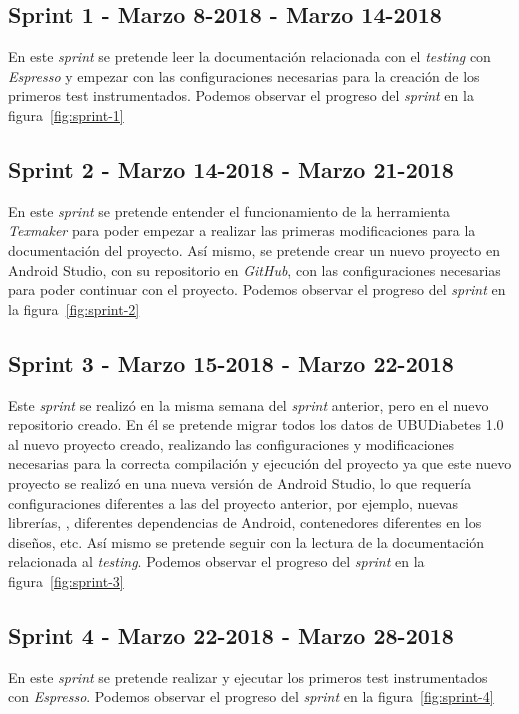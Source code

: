 \subsection{Sprint 1 - Marzo 8-2018 - Marzo 14-2018}
En este \textit{sprint} se pretende leer la documentación relacionada con el \textit{testing} con \textit{Espresso} y empezar con las configuraciones necesarias para la creación de los primeros test instrumentados.
Podemos observar el progreso del \textit{sprint} en la figura~\ref{fig:sprint-1}
\subsection{Sprint 2 - Marzo 14-2018 - Marzo 21-2018}
En este \textit{sprint} se pretende entender el funcionamiento de la herramienta \textit{Texmaker} para poder empezar a realizar las primeras modificaciones para la documentación del proyecto.
Así mismo, se pretende crear un nuevo proyecto en Android Studio, con su repositorio en \textit{GitHub}, con las configuraciones necesarias para poder continuar con el proyecto.
Podemos observar el progreso del \textit{sprint} en la figura~\ref{fig:sprint-2}
\subsection{Sprint 3 - Marzo 15-2018 - Marzo 22-2018}
Este \textit{sprint} se realizó en la misma semana del \textit{sprint} anterior, pero en el nuevo repositorio creado. En él se pretende migrar todos los datos de UBUDiabetes 1.0 al nuevo proyecto creado, realizando las configuraciones y modificaciones necesarias para la correcta compilación y ejecución del proyecto ya que este nuevo proyecto se realizó en una nueva versión de Android Studio, lo que requería configuraciones diferentes a las del proyecto anterior, por ejemplo, nuevas librerías, , diferentes dependencias de Android, contenedores diferentes en los diseños, etc. Así mismo se pretende seguir con la lectura de la documentación relacionada al \textit{testing}.
Podemos observar el progreso del \textit{sprint} en la figura~\ref{fig:sprint-3}
\subsection{Sprint 4 - Marzo 22-2018 - Marzo 28-2018}
En este \textit{sprint} se pretende realizar y ejecutar los primeros test instrumentados con \textit{Espresso}.
Podemos observar el progreso del \textit{sprint} en la figura~\ref{fig:sprint-4}
